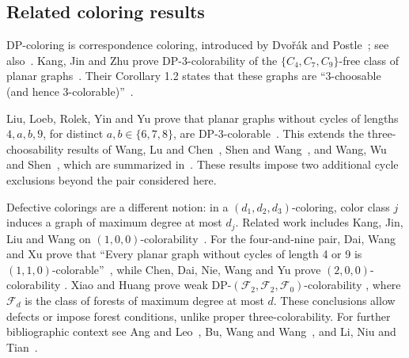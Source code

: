 \documentclass[11pt]{article}
\begin{document}
\begin{appendices}
\section{Related coloring results}\label{app:scope}
DP-coloring is correspondence coloring, introduced by Dvo\v{r}\'ak and
Postle~\cite{dvorakpostle}; see also~\cite[Section 1]{kjz}.
Kang, Jin and Zhu prove DP-3-colorability of the $\{C_4,C_7,C_9\}$-free
class of planar graphs~\cite[Theorem 1.1]{kjz}. Their Corollary 1.2 states
that these graphs are ``3-choosable (and hence 3-colorable)''~\cite{kjz}.

Liu, Loeb, Rolek, Yin and Yu prove that planar graphs without cycles of
lengths $4,a,b,9$, for distinct $a,b\in\{6,7,8\}$, are
DP-3-colorable~\cite[Theorem 1.3]{llryy}. This extends the
three-choosability results of Wang, Lu and Chen~\cite{wangluchen},
Shen and Wang~\cite{shenwang}, and Wang, Wu and Shen~\cite{wangwushen},
which are summarized in~\cite[Theorem 1.2]{llryy}. These results impose two
additional cycle exclusions beyond the pair considered here.

Defective colorings are a different notion: in a
$(d_1,d_2,d_3)$-coloring, color class $j$ induces a graph of maximum
degree at most $d_j$.
Related work includes Kang, Jin, Liu and Wang on $(1,0,0)$-colorability~\cite[Theorem 1.4]{jklw}.
For the four-and-nine pair, Dai, Wang and Xu prove that ``Every planar
graph without cycles of length 4 or 9 is $(1,1,0)$-colorable''~\cite{dai},
while Chen, Dai, Nie, Wang and Yu prove $(2,0,0)$-colorability
\cite[Theorem~1.4]{nie}. Xiao and Huang prove weak DP-$(\mathcal F_2,\mathcal F_2,
\mathcal F_0)$-colorability \cite[Corollary~1.2]{xiao}, where $\mathcal F_d$
is the class of forests of maximum degree at most $d$. These conclusions
allow defects or impose forest conditions, unlike proper three-colorability.
For further bibliographic context see Ang and Leo~\cite{ang}, Bu, Wang
and Wang~\cite{survey}, and Li, Niu and Tian~\cite{bordeaux}.
\end{appendices}
\end{document}
